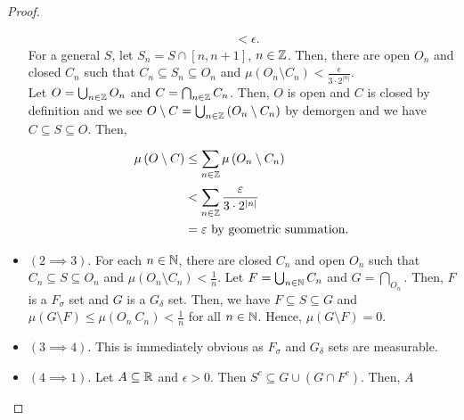 \begin{proof}
\begin{itemize}
\begin{align*}
							&< \epsilon
		.\end{align*}
		For a general \(S\), let \(S_{n} = S \cap \left[ n, n + 1 \right] \), \( n \in \mathbb{Z}\). Then, there are open \(O_{n}\) and closed \(C_{n}\) such that \(C_{n} \subseteq S_{n} \subseteq O_{n}\) and \( \mu\left( O_{n} \setminus C_{n} \right)  < \frac{\epsilon}{3\cdot 2^{\left| n \right| }}\).\\
		Let \(O = \bigcup_{n \in \mathbb{Z}} O_{n}\) and \(C = \bigcap_{n \in \mathbb{Z}}C_{n} \). Then, \(O\) is open and \(C\) is closed by definition and we see \(O \setminus C = \bigcup_{n \in \mathbb{Z}} \left( O_{n} \setminus C_{n} \right) \) by demorgen and we have \(C \subseteq S \subseteq O\). Then,
		\begin{align*}
			\mu\left( O \setminus C \right) &\le \sum_{n \in \mathbb{Z}}^{} \mu\left( O_{n} \setminus C_{n} \right) \\
							&< \sum_{ n \in \mathbb{Z}}^{} \frac{\varepsilon}{3 \cdot 2^{\left| n \right| }} \\
							&=  \varepsilon \text{ by geometric summation}
		.\end{align*}
	\item \(\left( 2 \implies 3 \right) \). For each \(n \in \mathbb{N}\), there are closed \(C_{n}\) and open \(O_{n}\) such that \(C_{n} \subseteq S \subseteq O_{n}\) and \( \mu\left( O_{n} \setminus C_{n} \right)  < \frac{1}{n}\). Let \(F = \bigcup_{n \in \mathbb{N}} C_{n}\) and \(G = \bigcap_{ O_{n}} \). Then, \(F\) is a \(F_{\sigma}\) set and \(G\) is a \(G_{\delta}\) set. Then, we have \(F \subseteq S \subseteq G\) and \( \mu\left( G \setminus F \right) \le \mu\left( O_{n} \ C_{n} \right)  < \frac{1}{n}\) for all \(n \in \mathbb{N}\). Hence, \( \mu \left( G \setminus F \right) = 0 \).
	\item \((3 \implies 4)\). This is immediately obvious as \(F_{\sigma}\) and \(G_{\delta}\) sets are measurable.
	\item \(\left( 4 \implies 1 \right) \). Let \(A \subseteq \mathbb{R}\) and \(\epsilon > 0\). Then \(S^{c} \subseteq G \cup \left( G \cap F^{c} \right) \). Then, \(A\)
	\end{itemize}
\end{proof}
